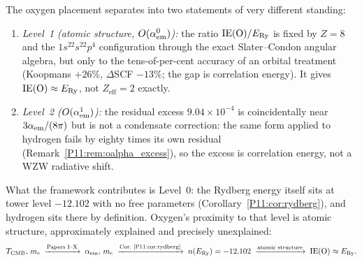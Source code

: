 \begin{remark}
\label{P11:rem:two_level}
The oxygen placement separates into two statements of very different
standing:
\begin{enumerate}[noitemsep]
\item \emph{Level~1 (atomic structure, $O(\alpha_{\mathrm{em}}^0)$):}
  the ratio $\mathrm{IE}(\mathrm{O})/E_{\mathrm{Ry}}$ is fixed by $Z=8$ and the
  $1s^22s^22p^4$ configuration through the exact Slater--Condon
  angular algebra, but only to the tens-of-per-cent accuracy of an
  orbital treatment (Koopmans $+26\%$, $\Delta$SCF $-13\%$; the gap is
  correlation energy).  It gives $\mathrm{IE}(\mathrm{O}) \approx E_{\mathrm{Ry}}$, not
  $Z_\mathrm{eff}=2$ exactly.
\item \emph{Level~2 ($O(\alpha_{\mathrm{em}}^1)$):}
  the residual excess $9.04\times10^{-4}$ is coincidentally near
  $3\alpha_{\mathrm{em}}/(8\pi)$ but is not a condensate correction: the same form
  applied to hydrogen fails by eighty times its own residual
  (Remark~\ref{P11:rem:oalpha_excess}), so the excess is
  correlation energy, not a WZW radiative shift.
\end{enumerate}
What the framework contributes is Level~0: the Rydberg energy itself
sits at tower level $-12.102$ with no free parameters
(Corollary~\ref{P11:cor:rydberg}), and hydrogen sits there by
definition.  Oxygen's proximity to that level is atomic structure,
approximately explained and precisely unexplained:
\[
  T_{\mathrm{CMB}},\, m_e
  \;\xrightarrow{\text{Papers I--X}}\;
  \alpha_{\mathrm{em}},\, m_e
  \;\xrightarrow{\text{Cor.~\ref{P11:cor:rydberg}}}\;
  n(E_{\mathrm{Ry}}) = -12.102
  \;\xrightarrow{\text{atomic structure}}\;
  \mathrm{IE}(\mathrm{O}) \approx E_{\mathrm{Ry}} .
\]
\end{remark}

